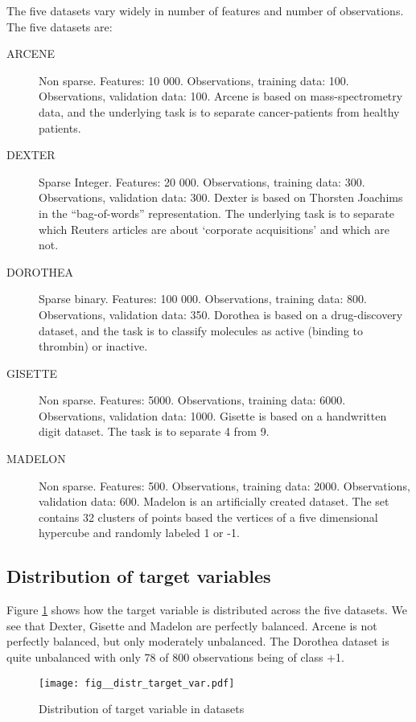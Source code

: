 \documentclass[12pt]{article}
\begin{document}
The five datasets vary widely in number of features and number of observations. The five datasets are:
\begin{description}
\item [ARCENE] Non sparse. Features: 10 000. Observations, training data: 100. Observations, validation data: 100. Arcene is based on mass-spectrometry data, and the underlying task is to separate cancer-patients from healthy patients. 
\item [DEXTER] Sparse Integer. Features: 20 000. Observations, training data: 300. Observations, validation data: 300. Dexter is based on Thorsten Joachims in the “bag-of-words” representation. The underlying task is to separate which Reuters articles are about `corporate acquisitions' and which are not.
\item[DOROTHEA] Sparse binary. Features: 100 000.  Observations, training data: 800.  Observations, validation data: 350. Dorothea is based on a drug-discovery dataset, and the task is to classify molecules as active (binding to thrombin) or inactive.
\item[GISETTE] Non sparse. Features: 5000. Observations, training data: 6000. Observations, validation data: 1000. Gisette is based on a handwritten digit dataset. The task is to separate 4 from 9.
\item[MADELON] Non sparse. Features: 500. Observations, training data: 2000. Observations, validation data: 600. Madelon is an artificially created dataset. The set contains 32 clusters of points based the vertices of a five dimensional hypercube and randomly labeled 1 or -1.
\end{description}

\subsection{Distribution of target variables}

Figure \ref{fig:distr_target_var} shows how the target variable is distributed across the five datasets. We see that Dexter, Gisette and Madelon are perfectly balanced. Arcene is not perfectly balanced, but only moderately unbalanced. The Dorothea dataset is quite unbalanced with only 78 of 800 observations being of class +1.

\begin{figure}[h]
  \begin{center}
    \texttt{[image: fig\_\_distr\_target\_var.pdf]}
    \caption{\label{fig:distr_target_var} Distribution of target variable in datasets}
  \end{center}
\end{figure}
\end{document}
